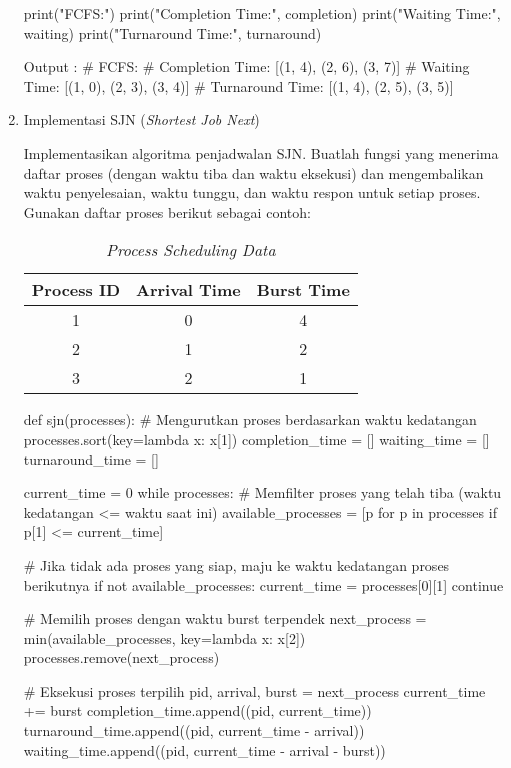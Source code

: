 \documentclass[12pt]{article}
\begin{document}
\begin{enumerate}
\begin{python}
print("FCFS:")
print("Completion Time:", completion)
print("Waiting Time:", waiting)
print("Turnaround Time:", turnaround)

Output : 
# FCFS:
# Completion Time: [(1, 4), (2, 6), (3, 7)] 
# Waiting Time: [(1, 0), (2, 3), (3, 4)]
# Turnaround Time: [(1, 4), (2, 5), (3, 5)]
\end{python}
        
    \item Implementasi SJN (\textit{Shortest Job Next})
        \par  Implementasikan algoritma penjadwalan SJN. Buatlah fungsi yang menerima daftar proses (dengan waktu tiba dan waktu eksekusi) dan mengembalikan waktu penyelesaian, waktu tunggu, dan waktu respon untuk setiap proses. Gunakan daftar proses berikut sebagai contoh:
        \begin{table}[h!]
        \centering
        \begin{tabular}{|c|c|c|}
        \hline
        \textbf{Process ID} & \textbf{Arrival Time} & \textbf{Burst Time} \\ \hline
        1 & 0 & 4 \\ \hline
        2 & 1 & 2 \\ \hline
        3 & 2 & 1 \\ \hline
        \end{tabular}
        \caption{\textit{Process Scheduling Data}}
        \end{table}
        
\begin{python}
def sjn(processes):
    # Mengurutkan proses berdasarkan waktu kedatangan
    processes.sort(key=lambda x: x[1]) 
    completion_time = []
    waiting_time = []
    turnaround_time = []
    
    current_time = 0
    while processes:
        # Memfilter proses yang telah tiba (waktu kedatangan <= waktu saat ini)
        available_processes = [p for p in processes if p[1] <= current_time]
        
        # Jika tidak ada proses yang siap, maju ke waktu kedatangan proses berikutnya
        if not available_processes:
            current_time = processes[0][1]
            continue
        
        # Memilih proses dengan waktu burst terpendek
        next_process = min(available_processes, key=lambda x: x[2])
        processes.remove(next_process)
        
        # Eksekusi proses terpilih
        pid, arrival, burst = next_process
        current_time += burst
        completion_time.append((pid, current_time))
        turnaround_time.append((pid, current_time - arrival))
        waiting_time.append((pid, current_time - arrival - burst))


\end{python}
\end{enumerate}
\end{document}
